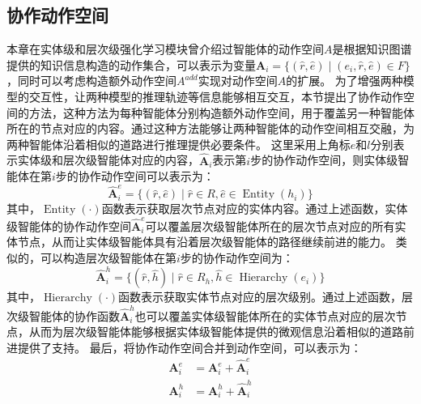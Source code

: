 \documentclass[algorithmlist, AutoFakeBold, AutoFakeSlant, figurelist, tablelist, nomlist, masters]{seuthesix}
\begin{document}
\subsection{协作动作空间}
本章在实体级和层次级强化学习模块曾介绍过智能体的动作空间$A$是根据知识图谱提供的知识信息构造的动作集合，可以表示为变量$\bm{A}_i = \{(\hat{r}, \hat{e}) \mid (e_i, \hat{r}, \hat{e}) \in F\}$，同时可以考虑构造额外动作空间$A^{add}$实现对动作空间$A$的扩展。
为了增强两种模型的交互性，让两种模型的推理轨迹等信息能够相互交互，本节提出了协作动作空间的方法，这种方法为每种智能体分别构造额外动作空间，用于覆盖另一种智能体所在的节点对应的内容。通过这种方法能够让两种智能体的动作空间相互交融，为两种智能体沿着相似的道路进行推理提供必要条件。
这里采用上角标$e$和$l$分别表示实体级和层次级智能体对应的内容，$\bm{\hat{A}}_i$表示第$i$步的协作动作空间，则实体级智能体在第$i$步的协作动作空间可以表示为：
\begin{equation}
  \bm{\hat{A}}_i^{e} = \{(\hat{r}, \hat{e}) \mid \hat{r} \in R, \hat{e} \in \operatorname{Entity}(h_i)\}
\end{equation}
其中，$\operatorname{Entity}(\cdot)$函数表示获取层次节点对应的实体内容。通过上述函数，实体级智能体的协作动作空间$\bm{\hat{A}}_i^{e}$可以覆盖层次级智能体所在的层次节点对应的所有实体节点，从而让实体级智能体具有沿着层次级智能体的路径继续前进的能力。
类似的，可以构造层次级智能体在第$i$步的协作动作空间为：
\begin{equation}
  \bm{\hat{A}}_i^{h} = \{(\hat{r}, \hat{h}) \mid \hat{r} \in R_h, \hat{h} \in \operatorname{Hierarchy}(e_i)\}
\end{equation}
其中，$\operatorname{Hierarchy}(\cdot)$函数表示获取实体节点对应的层次级别。通过上述函数，层次级智能体的协作函数$\bm{\hat{A}}_i^{h}$也可以覆盖实体级智能体所在的实体节点对应的层次节点，从而为层次级智能体能够根据实体级智能体提供的微观信息沿着相似的道路前进提供了支持。
最后，将协作动作空间合并到动作空间，可以表示为：
\begin{equation}
  \begin{aligned}
    \bm{A}_i^{e} &= \bm{A}_i^{e} + \bm{\hat{A}}_i^{e} \\
    \bm{A}_i^{h} &= \bm{A}_i^{h} + \bm{\hat{A}}_i^{h}
  \end{aligned}
\end{equation}
\end{document}
